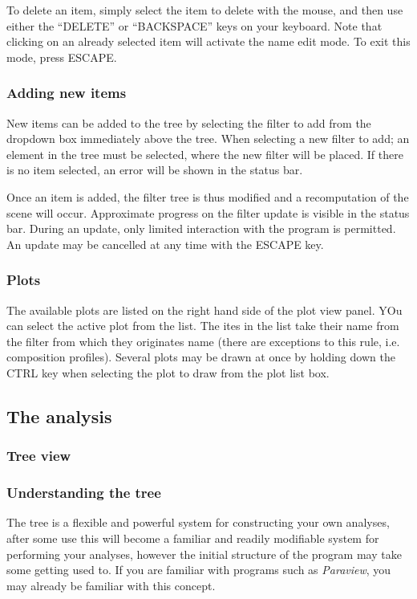 \documentclass[10pt]{article}
\begin{document}
To delete an item, simply select the item to delete with the mouse, and then use either the ``DELETE'' or ``BACKSPACE'' keys on your keyboard. Note that clicking on an already selected item will activate the name edit mode. To exit this mode, press ESCAPE. 
\subsubsection{Adding new items}


New items can be added to the tree by selecting the filter to add from the dropdown box immediately above the tree. When selecting a new filter to add; an element in the tree must be selected, where the new filter will be placed. If there is no item selected, an error will be shown in the status bar.  

Once an item is added, the filter tree is thus modified and a recomputation of the scene will occur. Approximate progress on the filter update is visible in the status bar. During an update, only limited interaction with the program is permitted. An update may be cancelled at any time with the ESCAPE key. 

\subsubsection{Plots}
The available plots are listed on the right hand side of the plot view panel. YOu can select the active plot from the list. The ites in the list take their name from the filter from which they originates name (there are exceptions to this rule, i.e. composition profiles). Several plots may be drawn at once by holding down the CTRL key when selecting the plot to draw from the plot list box. \subsection{The analysis}
\subsubsection{Tree view}
\subsubsection{Understanding the tree}
The tree is a flexible and powerful system for constructing your own analyses, after some use this will become a familiar and readily modifiable system for performing your analyses, however the initial structure of the program may take some getting used to. If you are familiar with programs such as \emph{Paraview}, you may already be familiar with this concept.  
\end{document}
